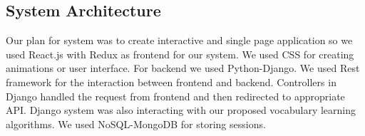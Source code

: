 \documentclass[11pt,a4paper]{article}
\begin{document}
% 
% 
% 
% 
% 
% 
% 
% 
% 
% 
% 
% 




\subsection{System Architecture}
Our plan for system was to create interactive and single page application so we used React.js with Redux as frontend for our system. We used CSS for creating animations or user interface. For backend we used Python-Django. We used Rest framework for the interaction between frontend and backend. Controllers in Django handled the request from frontend and then redirected to appropriate API. Django system was also interacting with our proposed vocabulary learning algorithms. We used NoSQL-MongoDB for storing sessions.   
\end{document}
